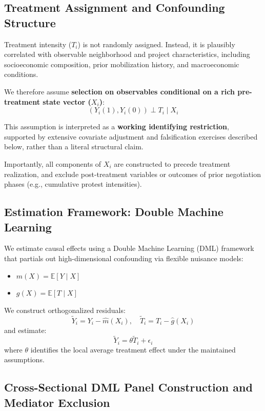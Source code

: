 \documentclass[11pt, letterpaper, oneside]{article}
\begin{document}
\subsection{Treatment Assignment and Confounding Structure}


Treatment intensity ($T_i$) is not randomly assigned. Instead, it is plausibly correlated with observable neighborhood and project characteristics, including socioeconomic composition, prior mobilization history, and macroeconomic conditions.

We therefore assume \textbf{selection on observables conditional on a rich pre-treatment state vector ($X_i$)}:
\begin{equation}
(Y_i(1), Y_i(0)) \perp T_i \mid X_i
\end{equation}

This assumption is interpreted as a \textbf{working identifying restriction}, supported by extensive covariate adjustment and falsification exercises described below, rather than a literal structural claim. 

Importantly, all components of $X_i$ are constructed to precede treatment realization, and exclude post-treatment variables or outcomes of prior negotiation phases (e.g., cumulative protest intensities).

\subsection{Estimation Framework: Double Machine Learning}

We estimate causal effects using a Double Machine Learning (DML) framework that partials out high-dimensional confounding via flexible nuisance models:
\begin{itemize}
    \item $m(X) = \mathbb{E}[Y \mid X]$
    \item $g(X) = \mathbb{E}[T \mid X]$
\end{itemize}

We construct orthogonalized residuals:
\begin{equation}
\tilde{Y}_i = Y_i - \hat{m}(X_i), \quad \tilde{T}_i = T_i - \hat{g}(X_i)
\end{equation}
and estimate:
\begin{equation}
\tilde{Y}_i = \theta \tilde{T}_i + \epsilon_i
\end{equation}
where $\theta$ identifies the local average treatment effect under the maintained assumptions.

\subsection{Cross-Sectional DML Panel Construction and Mediator Exclusion}
\label{sec:dml_panel_construction}
\end{document}
